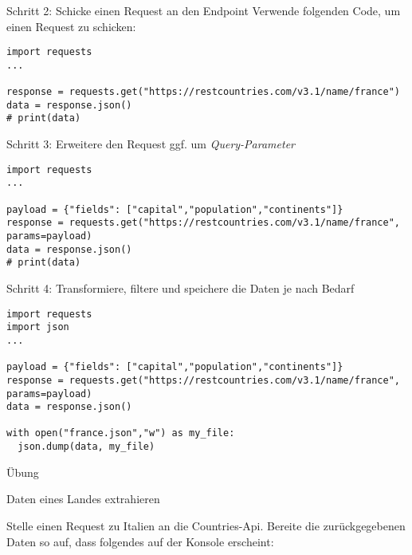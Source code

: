 \begin{fragile}
\begin{block}{Schritt 2: Schicke einen Request an den Endpoint}
\vspace{2pt}
Verwende folgenden Code, um einen Request zu schicken: 

\begin{verbatim}
import requests
...

response = requests.get("https://restcountries.com/v3.1/name/france")
data = response.json()
# print(data)
\end{verbatim}
\end{block}
\end{fragile}




\begin{fragile}
\begin{block}{Schritt 3: Erweitere den Request ggf. um \emph{Query-Parameter}}
\vspace{2pt}

\begin{verbatim}
import requests
...

payload = {"fields": ["capital","population","continents"]}
response = requests.get("https://restcountries.com/v3.1/name/france", params=payload)
data = response.json()
# print(data)
\end{verbatim}
\end{block}
\end{fragile}


\begin{fragile}
\begin{block}{Schritt 4: Transformiere, filtere und speichere die Daten je nach Bedarf}
\vspace{2pt}

\begin{verbatim}
import requests
import json
...

payload = {"fields": ["capital","population","continents"]}
response = requests.get("https://restcountries.com/v3.1/name/france", params=payload)
data = response.json()

with open("france.json","w") as my_file:
  json.dump(data, my_file)

\end{verbatim}
\end{block}
\end{fragile}


\begin{frame}{Übung}

\begin{block}{Daten eines Landes extrahieren}
\vspace{2pt}

Stelle einen Request zu Italien an die Countries-Api. Bereite die zurückgegebenen Daten so auf, dass folgendes auf der Konsole erscheint: 

 \\
 \\
\end{block}
\end{frame}






